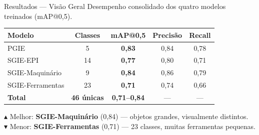 \begin{frame}{Resultados --- Visão Geral}
  \vspace{1mm}
  \centering
  {\small Desempenho consolidado dos quatro modelos treinados (mAP@0,5).}

  \vspace{3mm}

  \begin{center}
    \renewcommand{\arraystretch}{1.4}
    \begin{tabular}{@{}lcccc@{}}
      \toprule
      \textbf{\normalsize Modelo} &
      \textbf{\normalsize Classes} &
      \textbf{\normalsize mAP@0,5} &
      \textbf{\normalsize Precisão} &
      \textbf{\normalsize Recall} \\
      \midrule
      \rowcolor{inputcolor!10}
      {\normalsize PGIE} & {\normalsize 5} & {\normalsize \textbf{0,83}} & {\normalsize 0,84} & {\normalsize 0,78} \\
      \rowcolor{headcolor!10}
      {\normalsize SGIE-EPI} & {\normalsize 14} & {\normalsize \textbf{0,77}} & {\normalsize 0,80} & {\normalsize 0,71} \\
      \rowcolor{neckcolor!10}
      {\normalsize SGIE-Maquinário} & {\normalsize 9} & {\normalsize \cellcolor{headcolor!20}\textbf{0,84}} & {\normalsize 0,86} & {\normalsize 0,79} \\
      \rowcolor{outputcolor!10}
      {\normalsize SGIE-Ferramentas} & {\normalsize 23} & {\normalsize \cellcolor{skipcolor!15}\textbf{0,71}} & {\normalsize 0,74} & {\normalsize 0,66} \\
      \midrule
      \textbf{\normalsize Total} & \textbf{\normalsize 46 únicas} & \textbf{\normalsize 0,71--0,84} & --- & --- \\
      \bottomrule
    \end{tabular}
  \end{center}

  \vspace{2mm}

  \begin{center}
    \footnotesize
    \textcolor{headcolor!80!black}{$\blacktriangle$} Melhor: \textbf{SGIE-Maquinário} (0,84) --- objetos grandes, visualmente distintos.\\[1pt]
    \textcolor{skipcolor!80!black}{$\blacktriangledown$} Menor: \textbf{SGIE-Ferramentas} (0,71) --- 23 classes, muitas ferramentas pequenas.
  \end{center}

  \vfill
\end{frame}

